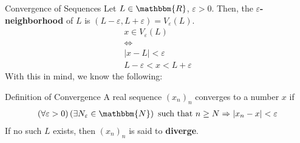 \documentclass[10pt]{extarticle}
\newcommand{\N}{\mathbbm{N}}
\newcommand{\R}{\mathbbm{R}}
\begin{document}
  \begin{problem}{Convergence of Sequences}
    Let $L\in\R$, $\varepsilon > 0$. Then, the $\varepsilon$\textbf{-neighborhood} of $L$ is $(L-\varepsilon, L+\varepsilon) = V_{\varepsilon}(L)$.
    \begin{align*}
      x\in V_{\varepsilon}(L)\\
      \Leftrightarrow\\
      |x-L| < \varepsilon\\
      L-\varepsilon < x < L+\varepsilon
    \end{align*}
    With this in mind, we know the following:
    \begin{problem}{Definition of Convergence}
      A real sequence $(x_n)_n$ converges to a number $x$ if 
      \begin{align*}
        \left(\forall \varepsilon > 0\right)\left(\exists N_{\varepsilon}\in\N\right) \text{ such that } n\geq N \Rightarrow |x_n-x| < \varepsilon
      \end{align*}
      If no such $L$ exists, then $(x_n)_n$ is said to \textbf{diverge}.\\


\end{problem}
\end{problem}
\end{document}
